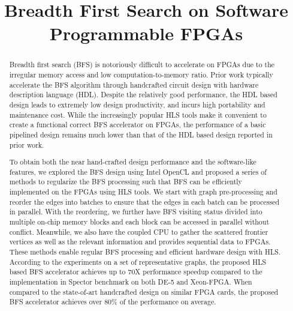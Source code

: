 \documentclass[conference]{IEEEtran}
\begin{document}
%
\title{Breadth First Search on Software Programmable FPGAs}

\maketitle

\begin{abstract}
    Breadth first search (BFS) is notoriously difficult to accelerate on FPGAs 
	due to the irregular memory access and low computation-to-memory ratio. 
	Prior work typically accelerate the BFS algorithm through handcrafted 
	circuit design with hardware description language (HDL). Despite
    the relatively good performance, the HDL based design leads to extremely 
	low design productivity, and incurs high portability and maintenance cost. 
	While the increasingly popular HLS tools make it convenient to create a functional 
	correct BFS accelerator on FPGAs, the performance of a basic pipelined design remains 
	much lower than that of the HDL based design reported in prior work. 

	To obtain both the near hand-crafted design performance and the software-like features, 
	we explored the BFS design using Intel OpenCL and proposed a series of methods to regularize the 
	BFS processing such that BFS can be efficiently implemented on the FPGAs using HLS tools. 
	We start with graph pre-processing and reorder the edges into batches to ensure that the 
	edges in each batch can be processed in parallel. With the reordering, we further have 
	BFS visiting status divided into multiple on-chip memory blocks and each block can be 
	accessed in parallel without conflict. Meanwhile, we also have the coupled CPU 
	to gather the scattered frontier vertices as well as the relevant information 
	and provides sequential data to FPGAs. These methods enable regular BFS processing 
	and efficient hardware design with HLS. According to the experiments 
	on a set of representative graphs, the proposed HLS based BFS accelerator achieves up to 70X
	performance speedup compared to the implementation in Spector benchmark on both DE-5 and 
	Xeon-FPGA. When compared to the state-of-art handcrafted design on similar FPGA cards, 
	the proposed BFS accelerator achieves over 80\% of the performance on average. 
\end{abstract}
\end{document}
